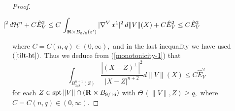 \documentclass[a4paper,11pt]{amsart}
\begin{document}
\begin{proof}
\begin{eqnarray}
&&\hspace{-3in} \leq C\, \sum_{j=1}^{q}\int_{B_{3/8}(z^{\prime}) \setminus \Sigma} |Du^{j}|^{2} \, d{\mathcal H}^{n} + C{\hat E}_{V}^{2} \leq C \, \int_{{\mathbf R} \times B_{3/8}(z^{\prime})} |\nabla^{V} \,x^{1}|^{2} \, d\|V\|(X) + C{\hat E}_{V}^{2}
\leq C{\hat E}_{V}^{2}
\end{eqnarray}
where $C = C(n, q) \in (0, \infty),$ and in the last inequality we have used $(\ref{tilt-ht}).$ Thus we deduce from 
(\ref{monotonicity-1}) that 
\begin{equation}\label{monotonicity-2}
\int_{B^{n+1}_{3/8}(Z)} \frac{|(X - Z)^{\perp}|^{2}}{|X - Z|^{n+2}} d\|V\|(X) \leq C{\hat E}_{V}^{2}
\end{equation}
for each $Z \in {\rm spt} \, \|V\| \cap ({\mathbf R} \times B_{9/16})$ with $\Theta \, (\|V\|, Z) \geq q,$ where $C = C(n, q) \in (0, \infty).$ 


\end{proof}
\end{document}
